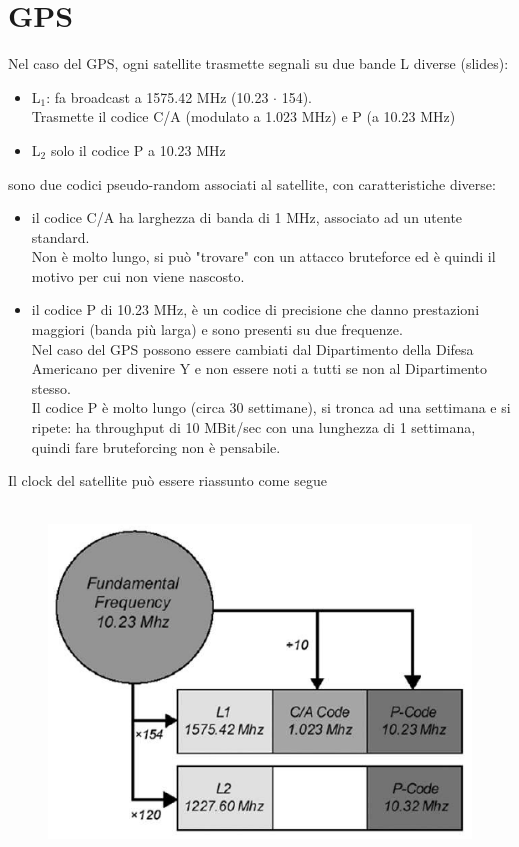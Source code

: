 \documentclass[oneside, 12pt]{extbook}
\begin{document}
\section{GPS}
Nel caso del GPS, ogni satellite trasmette segnali su due bande L diverse (slides):
\begin{itemize}
	\item L$_1$: fa broadcast a 1575.42 MHz (10.23 $\cdot$ 154).\\
	Trasmette il codice C/A (modulato a 1.023 MHz) e P (a 10.23 MHz)
	\item L$_2$ solo il codice P a 10.23 MHz
\end{itemize}
sono due codici pseudo-random associati al satellite, con caratteristiche diverse:
\begin{itemize}
	\item il codice C/A ha larghezza di banda di 1 MHz, associato ad un utente standard.\\
	Non è molto lungo, si può "trovare" con un attacco bruteforce ed è quindi il motivo per cui non viene nascosto.
	\item il codice P di 10.23 MHz, è un codice di precisione che danno prestazioni maggiori (banda più larga) e sono presenti su due frequenze.\\
	Nel caso del GPS possono essere cambiati dal Dipartimento della Difesa Americano per divenire Y e non essere noti a tutti se non al Dipartimento stesso.\\
	Il codice P è molto lungo (circa 30 settimane), si tronca ad una settimana e si ripete: ha throughput di 10 MBit/sec con una lunghezza di 1 settimana, quindi fare bruteforcing non è pensabile.
\end{itemize}
Il clock del satellite può essere riassunto come segue\\\\
\begin{figure}[!h]
	\includegraphics[scale=0.4]{immagini/localization/gps_clock.png}
\end{figure}\\
\end{document}
